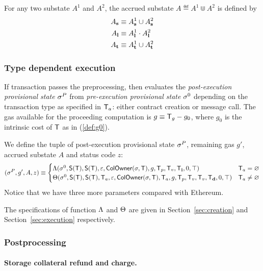For any two substate $A^1$ and $A^2$, the accrued substate $A\eqdef A^1\Cup A^2$ is defined by 
\begin{align}
	A_{\bf s} &\equiv A^1_{\bf s} \cup A^2_{\bf s} \\ 
	A_{\bf l} &\equiv A^1_{\bf l} \cdot A^2_{\bf l} \\
	A_{\bf t} &\equiv A^1_{\bf t} \cup A^2_{\bf t} 
\end{align}


\subsubsection{Type dependent execution}

If transaction passes the preprocessing, 
then {\name} evaluates the \emph{post-execution provisional state} $\mathbf{\sigma}^P$ from \emph{pre-execution provisional state} $\mathbf{\sigma}^0$ depending on the transaction type as specified in $\textsf{T}_a$: either contract creation or message call. 
%
The gas available for the proceeding computation is $g\equiv \textsf{T}_g-g_0$, where $g_0$ is the intrinsic cost of $\textsf{T}$ as in (\ref{def:g0}). 

We define the tuple of post-execution provisional state $\mathbf{\sigma}^{P}$, remaining gas $g'$, accrued substate $A$ and status code $z$:
\begin{align}\label{def:transform}
	(\mathbf{\sigma}^{P},g',A,z)\equiv
	\begin{cases}
		\mathrm{\Lambda}(\mathbf{\sigma}^0,\mathsf{S}{\left({\textsf{T}} \right)},\mathsf{S}{\left({\textsf{T}} \right)},\mathbb{\varepsilon}, \mathsf{ColOwner}(\mathbf{\sigma},\textsf{T}),g,\textsf{T}_p,\textsf{T}_v,\textsf{T}_{\bf i},0,\top) &  \textsf{T}_a=\varnothing \\
		\mathrm{\Theta}(\mathbf{\sigma}^0,\mathsf{S}{\left({\textsf{T}} \right)},\mathsf{S}{\left({\textsf{T}} \right)},\textsf{T}_a,\mathbb{\varepsilon},\mathsf{ColOwner}(\mathbf{\sigma},\textsf{T}),\textsf{T}_a,g,\textsf{T}_p,\textsf{T}_v,\textsf{T}_v,\textsf{T}_{\bf d},0,\top) & \textsf{T}_a\neq\varnothing
	\end{cases}
\end{align}
%
Notice that we have three more parameters compared with Ethereum. 

The specifications of function $\mathrm{\Lambda}$ and $\mathrm{\Theta}$ are given in Section~\ref{sec:creation} and Section~\ref{sec:execution} respectively.

\subsubsection{Postprocessing}\label{sec:tx_post_process}

\paragraph{Storage collateral refund and charge.}

